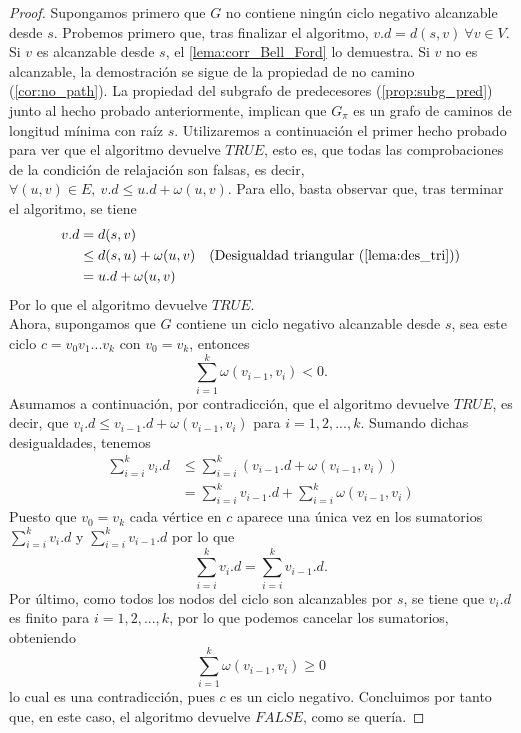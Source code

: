 \begin{proof}
	Supongamos primero que $G$ no contiene ningún ciclo negativo alcanzable desde $s$. Probemos primero que, tras finalizar el algoritmo, $v.d=d(s,v)\ \forall v\in V$. Si $v$ es alcanzable desde $s$, el \autoref{lema:corr_Bell_Ford} lo demuestra. Si $v$ no es alcanzable, la demostración se sigue de la propiedad de no camino (\autoref{cor:no_path}). La propiedad del subgrafo de predecesores (\autoref{prop:subg_pred}) junto al hecho probado anteriormente, implican que $G_{\pi}$ es un grafo de caminos de longitud mínima con raíz $s$. Utilizaremos a continuación el primer hecho probado para ver que el algoritmo devuelve $TRUE$, esto es, que todas las comprobaciones de la condición de relajación son falsas, es decir, $\forall (u,v)\in E,\ v.d\leq u.d+\omega(u,v)$. Para ello, basta observar que, tras terminar el algoritmo, se tiene
	\begin{align*}
		v.d & = d(s,v) \\
		& \leq d(s,u) + \omega(u,v) & (\textrm{Desigualdad triangular (\autoref{lema:des_tri})}) \\
		& = u.d + \omega(u,v)
	\end{align*}
	Por lo que el algoritmo devuelve $TRUE$. \\
	Ahora, supongamos que $G$ contiene un ciclo negativo alcanzable desde $s$, sea este ciclo $c=v_0v_1...v_k$ con $v_0=v_k$, entonces
	$$\sum_{i=1}^{k}\omega(v_{i-1},v_i)<0.$$
	Asumamos a continuación, por contradicción, que el algoritmo devuelve $TRUE$, es decir, que $v_i.d\leq v_{i-1}.d+\omega(v_{i-1},v_i)$ para $i=1,2,...,k$. Sumando dichas desigualdades, tenemos
	\begin{align*}
		\sum_{i=i}^{k}v_i.d &\leq \sum_{i=i}^{k}(v_{i-1}.d+\omega(v_{i-1},v_i)) \\
		& = \sum_{i=i}^{k}v_{i-1}.d+\sum_{i=i}^{k}\omega(v_{i-1},v_i)
	\end{align*}
	Puesto que $v_0=v_k$ cada vértice en $c$ aparece una única vez en los sumatorios $\sum_{i=i}^{k}v_i.d$ y $\sum_{i=i}^{k}v_{i-1}.d$ por lo que
	$$\sum_{i=i}^{k}v_i.d = \sum_{i=i}^{k}v_{i-1}.d.$$
	Por último, como todos los nodos del ciclo son alcanzables por $s$, se tiene que $v_i.d$ es finito para $i=1,2,...,k$, por lo que podemos cancelar los sumatorios, obteniendo
	$$\sum_{i=1}^{k}\omega(v_{i-1},v_i)\geq 0$$
	lo cual es una contradicción, pues $c$ es un ciclo negativo. Concluimos por tanto que, en este caso, el algoritmo devuelve $FALSE$, como se quería.
\end{proof}

